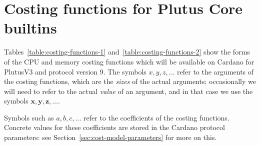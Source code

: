 \documentclass[a4paper]{article}
\begin{document}
\section{Costing functions for Plutus Core builtins}
Tables~\ref{table:costing-functions-1} and~\ref{table:costing-functions-2} show
the forms of the CPU and memory costing functions which will be available on
Cardano for PlutusV3 and protocol version 9.  The symbols $x, y, z, \ldots$
refer to the arguments of the costing functions, which are the \textit{sizes} of
the actual arguments; occasionally we will need to refer to the actual
\textit{value} of an argument, and in that case we use the symbols $\mathbf{x}, \mathbf{y},
\mathbf{z}, \ldots$.

Symbols such as $a, b, c, \ldots$ refer to the coefficients of the costing
functions.  Concrete values for these coefficients are stored in the Cardano
protocol parameters: see Section~\ref{sec:cost-model-parameters} for more on
this.

\newcommand\const{\ensuremath{\text{constant}}}
\newcommand\linx{\ensuremath{a+bx}}
\newcommand\liny{\ensuremath{a+by}}
\newcommand\linz{\ensuremath{a+bz}}
\newcommand\linplus{\ensuremath{a+b(x+y)}}
\newcommand\linmul{\ensuremath{a+bxy}}
\newcommand\linmax{\ensuremath{a+b\cdot\max(x,y)}}
\newcommand\linmin{\ensuremath{a+b\cdot\min(x,y)}}
\newcommand\linsub{\ensuremath{a+b\cdot\max(x-y,c)}}

\newcommand\quadr[1]{\ensuremath{c_{0} + c_{1}{#1} + c_{2}{#1}^2}}
\newcommand\quadrxy{See Note 1}
\end{document}
